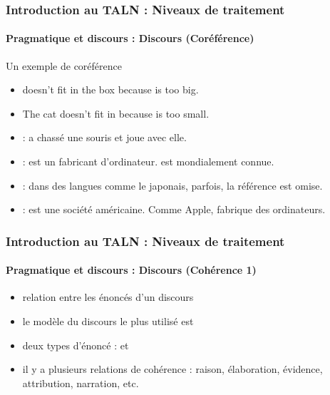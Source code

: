 \documentclass[xcolor=table]{beamer}
\begin{document}
\begin{frame}
\frametitle{Introduction au TALN : Niveaux de traitement}
\framesubtitle{Pragmatique et discours : Discours (Coréférence)}

\begin{exampleblock}{Un exemple de coréférence}
	\begin{itemize}
		\item {} doesn't fit in the box because  is too big.
		\item The cat doesn't fit in  because  is too small.
	\end{itemize}
\end{exampleblock}

\begin{itemize}
	\item {} :  a chassé une souris et  joue avec elle.
	\item {} :  est un fabricant d'ordinateur.  est mondialement connue.
	\item {} : dans des langues comme le japonais, parfois, la référence est omise.
	\item {} : est une société américaine. Comme Apple,  fabrique des ordinateurs.
\end{itemize}

\end{frame}

\begin{frame}
\frametitle{Introduction au TALN : Niveaux de traitement}
\framesubtitle{Pragmatique et discours : Discours (Cohérence 1)}

\begin{itemize}
	\item relation entre les énoncés d'un discours
	\item le modèle du discours le plus utilisé est 
	\item deux types d'énoncé :  et 
	\item il y a plusieurs relations de cohérence : raison, élaboration, évidence, attribution, narration, etc.
\end{itemize}

\end{frame}
\end{document}
